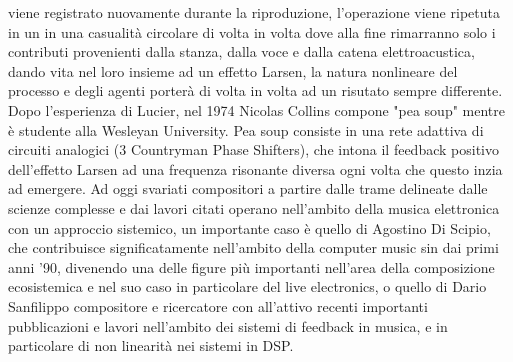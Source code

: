 viene registrato nuovamente durante la riproduzione, l'operazione
viene ripetuta in un in una casualità circolare di volta in volta dove alla fine rimarranno
solo i contributi provenienti dalla stanza, dalla voce e dalla catena elettroacustica,
dando vita nel loro insieme ad un effetto Larsen, la natura
nonlineare del processo e degli agenti porterà di volta in volta ad un risutato
sempre differente.
Dopo l'esperienza di Lucier, nel 1974 Nicolas Collins compone "pea soup"
mentre è studente alla Wesleyan University.
Pea soup consiste in una rete adattiva di circuiti analogici (3 Countryman Phase Shifters),
che intona il feedback positivo dell'effetto Larsen ad una frequenza risonante diversa
ogni volta che questo inzia ad emergere.
Ad oggi svariati compositori a partire dalle trame delineate dalle scienze complesse e
dai lavori citati operano nell'ambito della musica elettronica con un approccio sistemico,
un importante caso è quello di Agostino Di Scipio, che contribuisce significatamente
nell'ambito della computer music sin dai primi anni '90, divenendo una
delle figure più importanti nell'area della composizione ecosistemica e nel suo
caso in particolare del live electronics, o quello di Dario Sanfilippo
compositore e ricercatore con all'attivo recenti importanti pubblicazioni e lavori
nell'ambito dei sistemi di feedback in musica, e in particolare di non linearità nei sistemi
in DSP.

